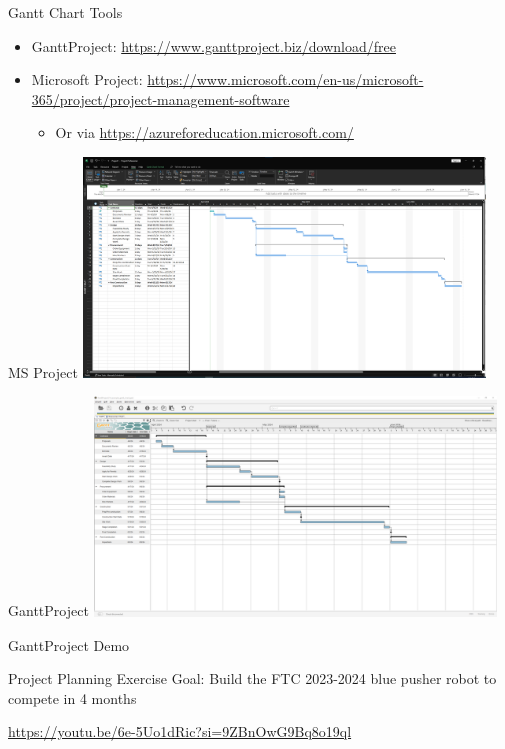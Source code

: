 \documentclass[aspectratio=169]{beamer}
\begin{document}
\begin{frame}{Gantt Chart Tools}
    \begin{itemize}
        \item GanttProject: \url{https://www.ganttproject.biz/download/free}
        \item Microsoft Project: \url{https://www.microsoft.com/en-us/microsoft-365/project/project-management-software}
        \begin{itemize}
            \item Or via \url{https://azureforeducation.microsoft.com/}
        \end{itemize}
    \end{itemize}
\end{frame}
\begin{frame}{MS Project}
    \centering
    \includegraphics[width=0.8\textwidth]{14_ms_project.png}
\end{frame}
\begin{frame}{GanttProject}
    \centering
    \includegraphics[width=0.8\textwidth]{14_ganttproject.png}
\end{frame}
\begin{frame}
    GanttProject Demo
\end{frame}
\begin{frame}{Project Planning Exercise}
    Goal: Build the FTC 2023-2024 blue pusher robot to compete in 4 months

    \url{https://youtu.be/6e-5Uo1dRic?si=9ZBnOwG9Bq8o19ql}
\end{frame}
\end{document}
